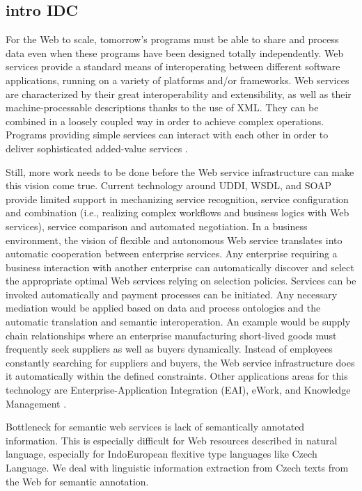 \subsection{intro IDC}
For the Web to scale, tomorrow's programs must be able to share and process data even when these programs have been designed totally independently. Web services provide a standard means of interoperating between different software applications, running on a variety of platforms and/or frameworks. Web services are characterized by their great interoperability and extensibility, as well as their machine-processable descriptions thanks to the use of XML. They can be combined in a loosely coupled way in order to achieve complex operations. Programs providing simple services can interact with each other in order to deliver sophisticated added-value services \citep{biblio:W3C_Activity}.

Still, more work needs to be done before the Web service infrastructure can make this vision come true. Current technology around UDDI, WSDL, and SOAP provide limited support in mechanizing service recognition, service configuration and combination (i.e., realizing complex workflows and business logics with Web services), service comparison and automated negotiation. In a business environment, the vision of flexible and autonomous Web service translates into automatic cooperation between enterprise services. Any enterprise requiring a business interaction with another enterprise can automatically discover and select the appropriate optimal Web services relying on selection policies. Services can be invoked automatically and payment processes can be initiated. Any necessary mediation would be applied based on data and process ontologies and the automatic translation and semantic interoperation. An example would be supply chain relationships where an enterprise manufacturing short-lived goods must frequently seek suppliers as well as buyers dynamically. Instead of employees constantly searching for suppliers and buyers, the Web service infrastructure does it automatically within the defined constraints. Other applications areas for this technology are Enterprise-Application Integration (EAI), eWork, and Knowledge Management \citep{biblio:SWSI}.

Bottleneck for semantic web services is lack of semantically annotated information. This is especially difficult for Web resources described in natural language, especially for IndoEuropean flexitive type languages like Czech Language. We deal with linguistic information extraction from Czech texts from the Web for semantic annotation. 


